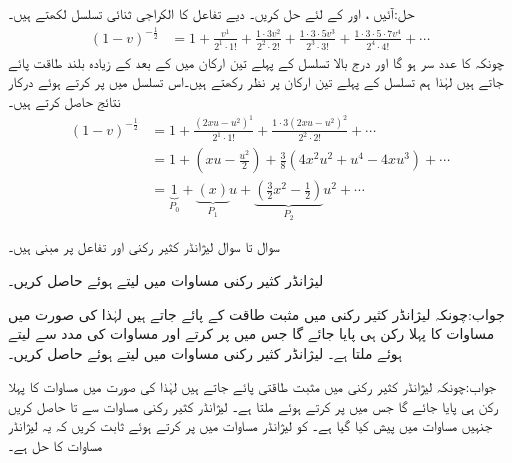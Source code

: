 حل:آئیں ،  اور  کے لئے حل کریں۔ دیے تفاعل کا الکراجی ثنائی تسلسل لکھتے ہیں۔
\begin{align*}
(1-v)^{-\frac{1}{2}}&=1+\frac{v^1}{2^1\cdot 1!}+\frac{1\cdot 3 v^2}{2^2\cdot 2!}+\frac{1\cdot 3 \cdot 5 v^3}{2^3\cdot 3!}+\frac{1\cdot 3 \cdot 5\cdot 7 v^4}{2^4\cdot 4!}+\cdots
\end{align*}
چونکہ  کا عدد سر  ہو گا اور درج بالا تسلسل کے پہلے تین ارکان میں کے بعد  کے زیادہ بلند طاقت پائے جاتے ہیں لہٰذا ہم تسلسل کے پہلے تین ارکان پر نظر رکھتے ہیں۔اس تسلسل میں  پر کرتے ہوئے درکار نتائج حاصل کرتے ہیں۔
\begin{align*}
(1-v)^{-\frac{1}{2}}&=1+\frac{(2xu-u^2)^1}{2^1\cdot 1!}+\frac{1\cdot 3 (2xu-u^2)^2}{2^2\cdot 2!}+\cdots\\
&=1+(xu-\frac{u^2}{2})+\frac{3}{8}(4x^2u^2+u^4-4xu^3)+\cdots\\
&=\underbrace{1}_{P_0}+\underbrace{\left(x\right)}_{P_1}u+\underbrace{\left(\frac{3}{2}x^2-\frac{1}{2}\right)}_{P_2}u^2+\cdots
\end{align*}

سوال  تا سوال  لیژانڈر کثیر رکنی اور تفاعل پر مبنی ہیں۔

لیژانڈر کثیر رکنی مساوات  میں  لیتے ہوئے  حاصل کریں۔

جواب:چونکہ لیژانڈر کثیر رکنی میں مثبت طاقت کے  پائے جاتے ہیں لہٰذا  کی صورت میں مساوات  کا پہلا رکن
  ہی پایا جائے گا جس میں  پر کرتے اور مساوات  کی مدد سے   لیتے ہوئے  ملتا ہے۔
لیژانڈر کثیر رکنی مساوات  میں  لیتے ہوئے  حاصل کریں۔

جواب:چونکہ لیژانڈر کثیر رکنی میں مثبت طاقتی  پائے جاتے ہیں لہٰذا  کی صورت میں مساوات  کا پہلا رکن
  ہی پایا جائے گا جس میں  پر کرتے ہوئے  ملتا ہے۔
لیژانڈر کثیر رکنی مساوات  سے  تا  حاصل کریں جنہیں مساوات  میں پیش کیا گیا ہے۔
  کو لیژانڈر مساوات  میں پر کرتے ہوئے ثابت کریں کہ یہ لیژانڈر مساوات کا حل ہے۔

